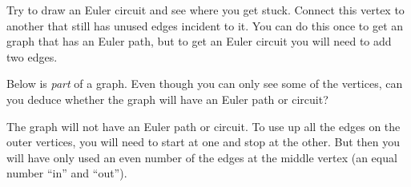 \documentclass[11pt]{exam}
\newcommand{\vtx}[2]{node[fill,circle,inner sep=0pt, minimum size=7pt,label=#1:#2]{}}
\renewcommand{\v}{\vtx{above}{}}
\begin{document}
\begin{questions}
\begin{center}
\end{center}

\begin{solution}
Try to draw an Euler circuit and see where you get stuck.  Connect this vertex to another that still has unused edges incident to it.  You can do this once to get an graph that has an Euler path, but to get an Euler circuit you will need to add two edges.
\end{solution}

\question Below is {\em part} of a graph.  Even though you can only see some of the vertices, can you deduce whether the graph will have an Euler path or circuit?

\begin{center}

\end{center}

\begin{solution}
The graph will not have an Euler path or circuit.  To use up all the edges on the outer vertices, you will need to start at one and stop at the other.  But then you will have only used an even number of the edges at the middle vertex (an equal number ``in'' and ``out'').
\end{solution}


\newpage



\end{questions}
\end{document}
